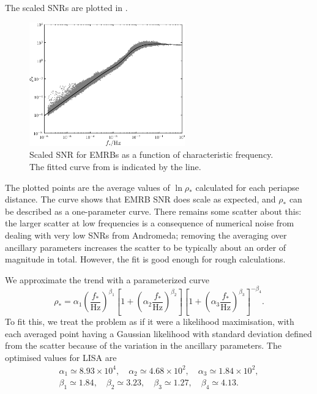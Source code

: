 The scaled SNRs are plotted in . 
\begin{figure}
\centering
 \includegraphics[width=0.6\textwidth]{./images/Fig_SNR_scaled_fit}
 \caption{Scaled SNR for EMRBs as a function of characteristic frequency. The fitted curve from  is indicated by the line.}
 \label{fig:scaled-SNR}
\end{figure}
The plotted points are the average values of $\ln \rho_\ast$ calculated for each periapse distance. The curve shows that EMRB SNR does scale as expected, and $\rho_\ast$ can be described as a one-parameter curve. There remains some scatter about this: the larger scatter at low frequencies is a consequence of numerical noise from dealing with very low SNRs from Andromeda; removing the averaging over ancillary parameters increases the scatter to be typically about an order of magnitude in total. However, the fit is good enough for rough calculations.

We approximate the trend with a parameterized curve
\begin{equation}
\rho_\ast = \alpha_1 \left(\dfrac{f_\ast}{\mathrm{Hz}}\right)^{\beta_1} \left[1 + \left(\alpha_2 \dfrac{f_\ast}{\mathrm{Hz}}\right)^{\beta_2}\right]\left[1 + \left(\alpha_3 \dfrac{f_\ast}{\mathrm{Hz}}\right)^{\beta_3}\right]^{-\beta_4}.
\label{eq:scaled-SNR}
\end{equation}
To fit this, we treat the problem as if it were a likelihood maximisation, with each averaged point having a Gaussian likelihood with standard deviation defined from the scatter because of the variation in the ancillary parameters. The optimised values for LISA are
\begin{equation}
\begin{array}{c}
\alpha_1 \simeq 8.93 \times 10^4, \quad \alpha_2 \simeq 4.68 \times 10^2, \quad \alpha_3 \simeq 1.84 \times 10^2,\\
\beta_1 \simeq 1.84, \quad \beta_2 \simeq 3.23, \quad \beta_3 \simeq 1.27, \quad \beta_4 \simeq 4.13.
\end{array}
\end{equation}

